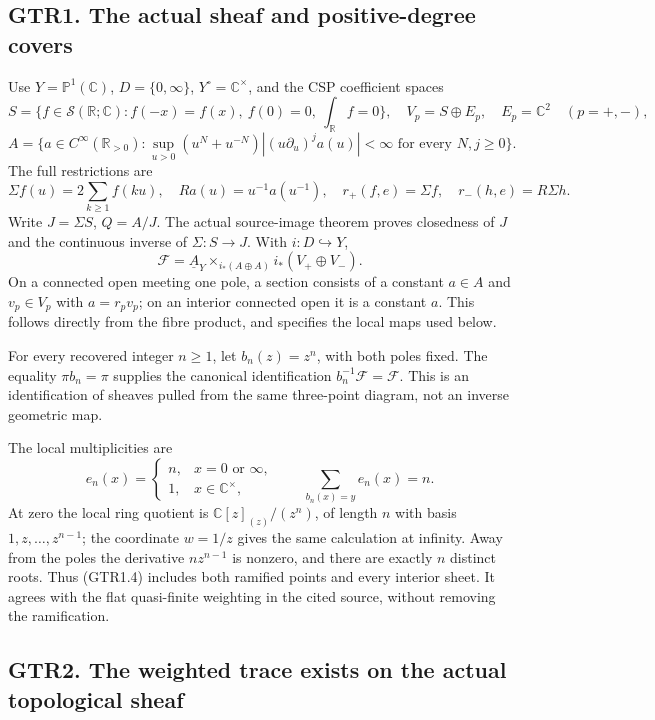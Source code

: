 \subsection{GTR1. The actual sheaf and positive-degree
covers}\label{gtr1.-the-actual-sheaf-and-positive-degree-covers}

Use \(Y=\mathbb P^1(\mathbb C)\), \(D=\{0,\infty\}\),
\(Y^\circ=\mathbb C^\times\), and the CSP coefficient spaces \[
S=\{f\in\mathcal S(\mathbb R;\mathbb C):f(-x)=f(x),\ f(0)=0,\ \int_{\mathbb R}f=0\},
\quad V_p=S\oplus E_p,\quad E_p=\mathbb C^2\quad(p=+,-),
\] \[
A=\{a\in C^\infty(\mathbb R_{>0}):
\sup_{u>0}(u^N+u^{-N})|(u\partial_u)^ja(u)|<\infty
\text{ for every }N,j\ge0\}.
\tag{GTR1.1}
\] The full restrictions are \[
\Sigma f(u)=2\sum_{k\ge1}f(ku),\quad
Ra(u)=u^{-1}a(u^{-1}),\quad
r_+(f,e)=\Sigma f,\quad r_-(h,e)=R\Sigma h.
\tag{GTR1.2}
\] Write \(J=\Sigma S\), \(Q=A/J\). The actual source-image theorem
proves closedness of \(J\) and the continuous inverse of
\(\Sigma:S\to J\). With \(i:D\hookrightarrow Y\), \[
\mathscr F=\underline A_Y\times_{i_*(A\oplus A)}i_*(V_+\oplus V_-).
\tag{GTR1.3}
\] On a connected open meeting one pole, a section consists of a
constant \(a\in A\) and \(v_p\in V_p\) with \(a=r_pv_p\); on an interior
connected open it is a constant \(a\). This follows directly from the
fibre product, and specifies the local maps used below.

For every recovered integer \(n\ge1\), let \(b_n(z)=z^n\), with both
poles fixed. The equality \(\pi b_n=\pi\) supplies the canonical
identification \(b_n^{-1}\mathscr F=\mathscr F\). This is an
identification of sheaves pulled from the same three-point diagram, not
an inverse geometric map.

The local multiplicities are \[
e_n(x)=\begin{cases}n,&x=0\text{ or }\infty,\\1,&x\in\mathbb C^\times,\end{cases}
\qquad \sum_{b_n(x)=y}e_n(x)=n.
\tag{GTR1.4}
\] At zero the local ring quotient is \(\mathbb C[z]_{(z)}/(z^n)\), of
length \(n\) with basis \(1,z,\ldots,z^{n-1}\); the coordinate \(w=1/z\)
gives the same calculation at infinity. Away from the poles the
derivative \(nz^{n-1}\) is nonzero, and there are exactly \(n\) distinct
roots. Thus (GTR1.4) includes both ramified points and every interior
sheet. It agrees with the flat quasi-finite weighting in the cited
source, without removing the ramification.

\subsection{GTR2. The weighted trace exists on the actual topological
sheaf}\label{gtr2.-the-weighted-trace-exists-on-the-actual-topological-sheaf}

